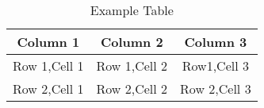 \documentclass{article}
\begin{document}
	
\begin{table}[h]
	\centering
	
	\begin{tabular}{|c|c|c|}
		\hline
		\textbf{Column 1} & \textbf{Column 2} & \textbf{Column 3} \\
		\hline
		Row 1,Cell 1 & Row 1,Cell 2 & Row1,Cell 3\\
		\hline
		Row 2,Cell 1 & Row 2,Cell 2 & Row 2,Cell 3\\
		\hline
	\end{tabular}
	\caption{Example Table}
	\label{tab:example}
\end{table}
\end{document}
